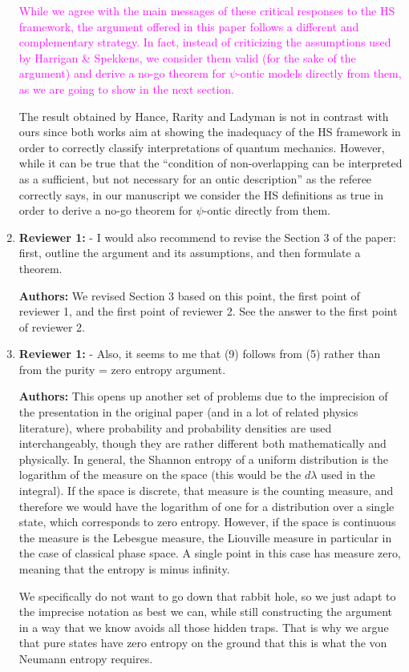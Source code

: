 \documentclass[11pt, executivepaper]{article}
\begin{document}
\begin{enumerate}
\textcolor{magenta}{While we agree with the main messages of these critical responses to the HS framework, the argument offered in this paper follows a different and complementary strategy. In fact, instead of criticizing the assumptions used by Harrigan \& Spekkens, we consider them valid (for the sake of the argument) and derive a no-go theorem for $\psi$-ontic models directly from them, as we are going to show in the next section.}

The result obtained by Hance, Rarity and Ladyman is not in contrast with ours since both works aim at showing the inadequacy of the HS framework in order to correctly classify interpretations of quantum mechanics. However, while it can be true that  the ``condition of non-overlapping can be interpreted as a sufficient, but not necessary for an ontic description'' as the referee correctly says, in our manuscript we consider the HS definitions as true in order to derive a no-go theorem for $\psi$-ontic directly from them.

\item \textbf{Reviewer 1:} - I would also recommend to revise the Section 3 of the paper: first, outline the argument and its assumptions, and then formulate a theorem.
\vspace{2mm}

\textbf{Authors:} We revised Section 3 based on this point, the first point of reviewer 1, and the first point of reviewer 2. See the answer to the first point of reviewer 2.

\item \textbf{Reviewer 1:}  - Also, it seems to me that (9) follows from (5) rather than from the purity = zero entropy argument.
\vspace{2mm}

\textbf{Authors:} This opens up another set of problems due to the imprecision of the presentation in the original paper (and in a lot of related physics literature), where probability and probability densities are used interchangeably, though they are rather different both mathematically and physically. In general, the Shannon entropy of a uniform distribution is the logarithm of the measure on the space (this would be the $d\lambda$ used in the integral). If the space is discrete, that measure is the counting measure, and therefore we would have the logarithm of one for a distribution over a single state, which corresponds to zero entropy. However, if the space is continuous the measure is the Lebesgue measure, the Liouville measure in particular in the case of classical phase space. A single point in this case has measure zero, meaning that the entropy is minus infinity.

We specifically do not want to go down that rabbit hole, so we just adapt to the imprecise notation as best we can, while still constructing the argument in a way that we know avoids all those hidden traps. That is why we argue that pure states have zero entropy on the ground that this is what the von Neumann entropy requires.


\end{enumerate}
 
\end{document}
